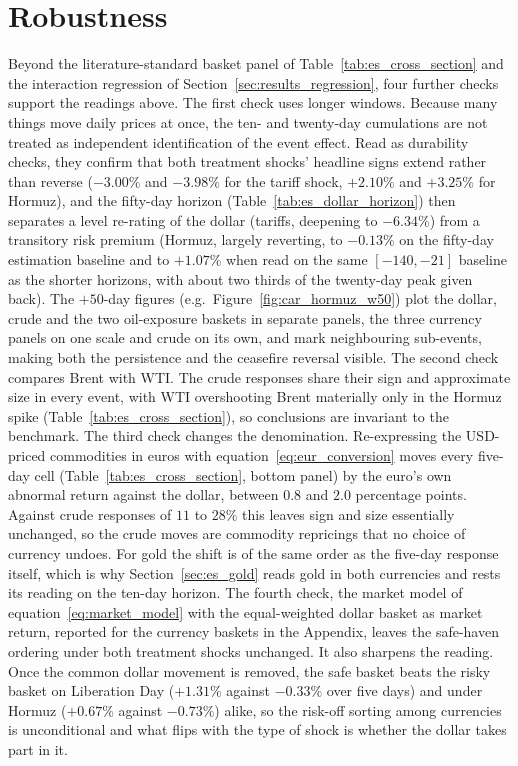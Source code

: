 \section{Robustness}
\label{sec:es_robust}

Beyond the literature-standard basket panel of Table~\ref{tab:es_cross_section} and the interaction
regression of Section~\ref{sec:results_regression}, four further checks support the readings
above. The first check uses longer windows. Because many
things move daily prices at once, the ten- and twenty-day cumulations are not treated as
independent identification of the event effect. Read as durability checks, they confirm
that both treatment shocks' headline signs extend rather than reverse ($-3.00\%$ and $-3.98\%$ for the
tariff shock, $+2.10\%$ and $+3.25\%$ for Hormuz), and the fifty-day horizon
(Table~\ref{tab:es_dollar_horizon}) then separates a level re-rating of
the dollar (tariffs, deepening to $-6.34\%$) from a transitory risk premium (Hormuz, largely reverting, to $-0.13\%$ on the fifty-day
estimation baseline and to $+1.07\%$ when read
on the same $[-140,-21]$ baseline as the shorter horizons, with about two thirds of the twenty-day peak given back). The $+50$-day figures
(e.g.\ Figure~\ref{fig:car_hormuz_w50}) plot the dollar, crude and the two oil-exposure
baskets in separate panels, the three currency panels on one scale and crude on its own, and mark neighbouring sub-events,
making both the persistence and the ceasefire reversal visible.
The second check compares Brent with WTI. The crude responses share their sign and approximate size
in every event, with WTI overshooting Brent materially only in the Hormuz spike
(Table~\ref{tab:es_cross_section}), so conclusions are invariant to the benchmark.
The third check changes the denomination. Re-expressing the USD-priced commodities in euros with equation~\eqref{eq:eur_conversion} moves every five-day cell (Table~\ref{tab:es_cross_section}, bottom panel) by the euro's own abnormal return against the dollar, between $0.8$ and $2.0$ percentage points. Against crude responses of $11$ to $28\%$ this leaves sign and size essentially unchanged, so the crude moves are commodity repricings that no choice of currency undoes. For gold the shift is of the same order as the five-day response itself, which is why Section~\ref{sec:es_gold} reads gold in both currencies and rests its reading on the ten-day horizon.
The fourth check, the market model of equation~\eqref{eq:market_model} with the equal-weighted dollar basket as market return, reported for the currency baskets
in the Appendix, leaves the safe-haven ordering under both treatment shocks
unchanged. It also sharpens the reading. Once the common dollar movement is removed, the
safe basket beats the risky basket on Liberation Day ($+1.31\%$ against $-0.33\%$ over five
days) and under Hormuz ($+0.67\%$ against $-0.73\%$) alike, so the risk-off sorting among
currencies is unconditional and what flips with the type of shock is whether the dollar
takes part in it.

